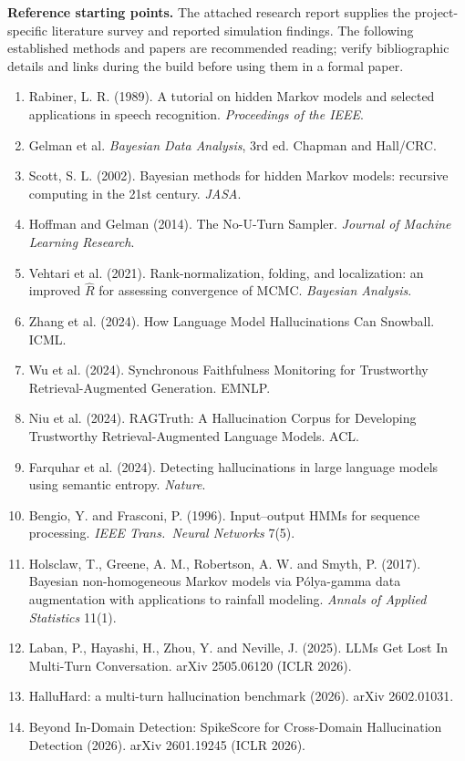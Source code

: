 \documentclass[11pt,letterpaper]{article}
\begin{document}
\textbf{Reference starting points.} The attached research report supplies the project-specific literature survey and reported simulation findings. The following established methods and papers are recommended reading; verify bibliographic details and links during the build before using them in a formal paper.
\begin{enumerate}[leftmargin=*]
\item Rabiner, L. R. (1989). A tutorial on hidden Markov models and selected applications in speech recognition. \emph{Proceedings of the IEEE}.
\item Gelman et al. \emph{Bayesian Data Analysis}, 3rd ed. Chapman and Hall/CRC.
\item Scott, S. L. (2002). Bayesian methods for hidden Markov models: recursive computing in the 21st century. \emph{JASA}.
\item Hoffman and Gelman (2014). The No-U-Turn Sampler. \emph{Journal of Machine Learning Research}.
\item Vehtari et al. (2021). Rank-normalization, folding, and localization: an improved $\widehat R$ for assessing convergence of MCMC. \emph{Bayesian Analysis}.
\item Zhang et al. (2024). How Language Model Hallucinations Can Snowball. ICML.
\item Wu et al. (2024). Synchronous Faithfulness Monitoring for Trustworthy Retrieval-Augmented Generation. EMNLP.
\item Niu et al. (2024). RAGTruth: A Hallucination Corpus for Developing Trustworthy Retrieval-Augmented Language Models. ACL.
\item Farquhar et al. (2024). Detecting hallucinations in large language models using semantic entropy. \emph{Nature}.
\item Bengio, Y. and Frasconi, P. (1996). Input--output HMMs for sequence processing. \emph{IEEE Trans.\ Neural Networks} 7(5).
\item Holsclaw, T., Greene, A. M., Robertson, A. W. and Smyth, P. (2017). Bayesian non-homogeneous Markov models via P\'olya-gamma data augmentation with applications to rainfall modeling. \emph{Annals of Applied Statistics} 11(1).
\item Laban, P., Hayashi, H., Zhou, Y. and Neville, J. (2025). LLMs Get Lost In Multi-Turn Conversation. arXiv 2505.06120 (ICLR 2026).
\item HalluHard: a multi-turn hallucination benchmark (2026). arXiv 2602.01031.
\item Beyond In-Domain Detection: SpikeScore for Cross-Domain Hallucination Detection (2026). arXiv 2601.19245 (ICLR 2026).

\end{enumerate}
\end{document}
